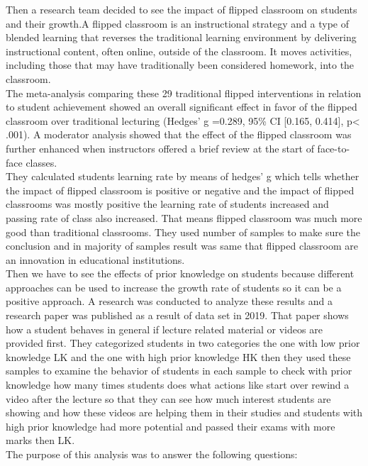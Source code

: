 Then a research team decided to see the impact of flipped classroom on students and their growth.A flipped classroom is an instructional strategy and a type of blended learning that reverses the traditional learning environment by delivering instructional content, often online, outside of the classroom. It moves activities, including those that may have traditionally been considered homework, into the classroom.\\
The meta-analysis comparing these 29 traditional flipped interventions in relation to student achievement showed an overall significant effect in favor of the flipped classroom over traditional lecturing (Hedges' g =0.289, 95\% CI [0.165, 0.414], p< .001). A moderator analysis showed that the effect of the flipped classroom was further enhanced when instructors offered a brief review at the start of face-to-face classes.\\
They calculated students learning rate by means of hedges' g which tells whether the impact of flipped classroom is positive or negative and the impact of flipped classrooms was mostly positive the learning rate of students increased and passing rate of class also increased. That means flipped classroom was much more good than traditional classrooms. They used number of samples to make sure the conclusion and in majority of samples result was same that flipped classroom are an innovation in educational institutions.\cite{Lo2019}\\
Then we have to see the effects of prior knowledge on students because different approaches can be used to increase the growth rate of students so it can be a positive approach. A research was conducted to analyze these results and a research paper was published as a result of data set in 2019. That paper shows how a student behaves in general if lecture related material or videos are provided first. They categorized students in two categories the one with low prior knowledge LK and the one with high prior knowledge HK then they used these samples to examine the behavior of students in each sample to check with prior knowledge how many times students does what actions like start over rewind a video after the lecture so that they can see how much interest students are showing and how these videos are helping them in their studies and students with high prior knowledge had more potential and passed their exams with more marks then LK.\\
The purpose of this analysis was to answer the following questions:\\
